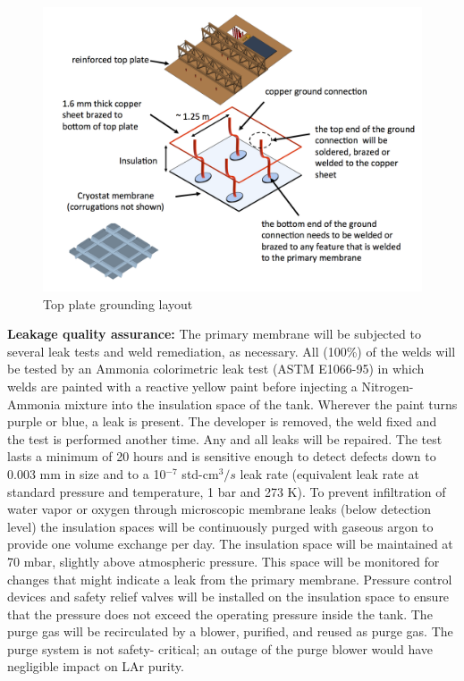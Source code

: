 \begin{figure}
\begin{center}
\includegraphics[width=1.0\textwidth]{figures/cryostat-top-plate-gnd} 
\caption[Top plate grounding layout]{\label{fig:top-plate-gnd}Top plate grounding layout}
\end{center}
\end{figure}

\textbf{Leakage quality assurance: }
%
The primary membrane will be subjected to several leak tests and weld remediation, as necessary. All 
(100\%) of the welds will be tested by an Ammonia colorimetric leak test (ASTM E1066-95) in which 
welds are painted with a reactive yellow paint before injecting a Nitrogen-Ammonia mixture into the 
insulation space of the tank. Wherever the paint turns purple or blue, a leak is present. The developer is 
removed, the weld fixed and the test is performed another time. Any and all leaks will be repaired. The 
test lasts a minimum of 20 hours and is sensitive enough to detect defects down to 0.003 mm in size 
and to a 10$^{-7}$ std-cm$^3/s$ leak rate (equivalent leak rate at standard pressure and temperature, 1 bar and 
273 K). To prevent infiltration of water vapor or oxygen through microscopic membrane leaks (below 
detection level) the insulation spaces will be continuously purged with gaseous argon to provide one 
volume exchange per day. The insulation space will be maintained at 70 mbar, slightly above 
atmospheric pressure. This space will be monitored for changes that might indicate a leak from the 
primary membrane. Pressure control devices and safety relief valves will be installed on the insulation 
space to ensure that the pressure does not exceed the operating pressure inside the tank. The purge gas 
will be recirculated by a blower, purified, and reused as purge gas. The purge system is not safety-
critical; an outage of the purge blower would have negligible impact on LAr purity.


